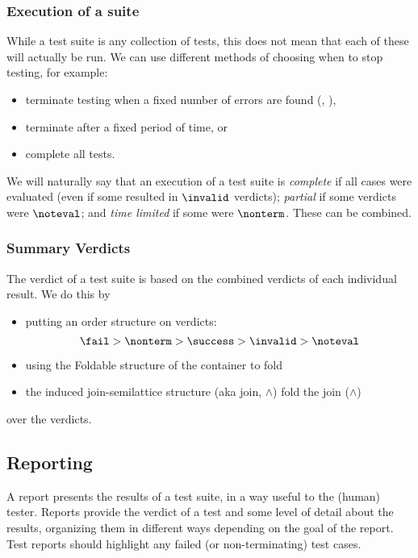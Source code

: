 \subsubsection{Execution of a suite}

While a test suite is any collection of tests, this does not mean that each
of these will actually be run.  We can use different methods of choosing 
when to stop testing, for example:
\begin{itemize}
\item terminate testing when a fixed number of errors are found (\QC, \SC),
\item terminate after a fixed period of time, or
\item complete all tests.
\end{itemize}

We will naturally say that an execution of a test suite 
is \emph{complete} if all cases were evaluated (even if some resulted
in $\invalid$ verdicts); \emph{partial} if some verdicts were $\noteval$;
and \emph{time limited} if some were $\nonterm$. These can be combined.

\subsubsection{Summary Verdicts}

The verdict of a test suite is based on the combined verdicts of each individual result.
We do this by
\begin{itemize}
\item putting an order structure on verdicts:
$$ \fail > \nonterm > \success > \invalid > \noteval$$
\item using the Foldable structure of the container to fold
\item the induced join-semilattice structure (aka join, $\wedge$)
fold the join ($\wedge$) 
\end{itemize}
\noindent over the verdicts.

\subsection{Reporting}


A report presents the results of a test suite, in a way useful to the
(human) tester.
Reports provide the verdict of a test and some level of detail about the results,
organizing them in different ways depending on the goal of the report.
Test reports should highlight any failed (or non-terminating) test cases.

